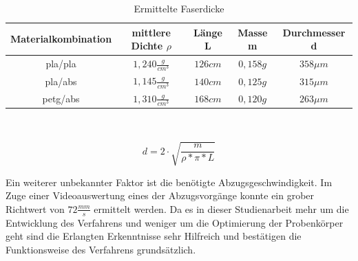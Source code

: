 \begin{center}
    \begin{table}[!h]
    \centering
        \begin{tabular}{c|c|c|c|c}
                Materialkombination & mittlere Dichte $\rho$ & Länge L & Masse m & Durchmesser d \\
                \hline
                \acs{pla}/\acs{pla} & $1,240 \frac{g}{cm^3}$ & $126 cm$ & $0,158g$ & $358\mu m$ \\
                \acs{pla}/\acs{abs} & $1,145 \frac{g}{cm^3}$ & $140 cm$ & $0,125g$ & $315\mu m$ \\
                \acs{petg}/\acs{abs} & $1,310 \frac{g}{cm^3}$ & $168 cm$ & $0,120g$ & $263\mu m$ \\
                
        \end{tabular}
        \\
        \begin{center}
            \begin{equation*}
                d = 2 \cdot \sqrt{\frac{m}{\rho * \pi * L}}
            \end{equation*}
        \end{center}
    \caption{Ermittelte Faserdicke}
    \label{tab:erm_faserdicke}
    \end{table}
\end{center}

Ein weiterer unbekannter Faktor ist die benötigte Abzugsgeschwindigkeit. Im Zuge einer Videoauswertung eines der Abzugsvorgänge konnte ein grober Richtwert von $72\frac{mm}{s}$ ermittelt werden.
Da es in dieser Studienarbeit mehr um die Entwicklung des Verfahrens und weniger um die Optimierung der Probenkörper geht sind die Erlangten Erkenntnisse sehr Hilfreich und bestätigen die Funktionsweise des Verfahrens grundsätzlich.
